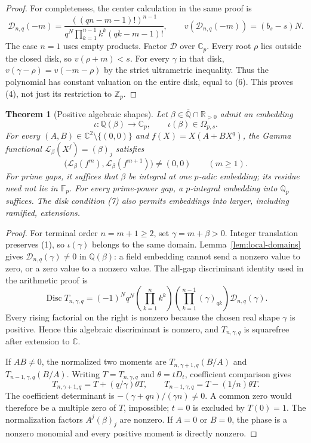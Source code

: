 \documentclass[11pt]{article}
\newtheorem{theorem}[lemma]{Theorem}
\newcommand{\Cp}{\mathbb C_p}
\newcommand{\Zp}{\mathbb Z_p}
\newcommand{\Q}{\mathbb Q}
\newcommand{\C}{\mathbb C}
\begin{document}
\begin{proof}
For completeness, the center calculation in the same proof is
\[
 \mathcal D_{n,q}(-m)=
 \frac{((qn-m-1)!)^{n-1}}
 {q^N\prod_{k=1}^{n-1}k^k(qk-m-1)!},
 \qquad
 v(\mathcal D_{n,q}(-m))=(b_s-s)N.
 \tag{6}
\]
The case $n=1$ uses empty products.
Factor $\mathcal D$ over $\Cp$. Every root $\rho$ lies outside the
closed disk, so $v(\rho+m)<s$.
For every $\gamma$ in that disk,
$v(\gamma-\rho)=v(-m-\rho)$ by the strict ultrametric inequality.
Thus the polynomial has constant valuation on the entire disk,
equal to (6). This proves (4), not just its restriction to $\Zp$.
\end{proof}

\begin{theorem}[Positive algebraic shapes]\label{thm:algebraic-lower-one}
Let $\beta\in\overline{\Q}\cap\mathbb R_{>0}$ admit an embedding
\[
 \iota:\Q(\beta)\longrightarrow\Cp,\qquad
                  \iota(\beta)\in\Omega_{p,s}.
 \tag{7}
\]
For every $(A,B)\in\C^2\setminus\{(0,0)\}$ and
$f(X)=X(A+BX^q)$, the Gamma functional
$\mathcal L_\beta(X^j)=(\beta)_j$ satisfies
\[
 \bigl(\mathcal L_\beta(f^m),\mathcal L_\beta(f^{m+1})\bigr)
                     \ne(0,0)\qquad(m\ge1).
 \tag{8}
\]
For prime gaps, it suffices that $\beta$ be integral at one $p$-adic
embedding; its residue need not lie in $\mathbb F_p$.
For every prime-power gap, a $p$-integral embedding into $\mathbb Q_p$
suffices. The disk condition (7) also permits embeddings into larger,
including ramified, extensions.
\end{theorem}
\begin{proof}
For terminal order $n=m+1\ge2$, set $\gamma=m+\beta>0$.
Integer translation preserves (1), so $\iota(\gamma)$ belongs to the
same domain. Lemma~\ref{lem:local-domains} gives
$\mathcal D_{n,q}(\gamma)\ne0$ in $\Q(\beta)$:
a field embedding cannot send a nonzero value to zero, or a zero value
to a nonzero value.
The all-gap discriminant identity used in the arithmetic proof is
\[
 \operatorname{Disc} T_{n,\gamma,q}
 =(-1)^Nq^N\left(\prod_{k=1}^n k^k\right)
       \left(\prod_{k=1}^{n-1}(\gamma)_{qk}\right)
       \mathcal D_{n,q}(\gamma).
 \tag{9}
\]
Every rising factorial on the right is nonzero because the chosen real
shape $\gamma$ is positive. Hence this algebraic discriminant is nonzero,
and $T_{n,\gamma,q}$ is squarefree after extension to $\C$.

If $AB\ne0$, the normalized two moments are
$T_{n,\gamma+1,q}(B/A)$ and $T_{n-1,\gamma,q}(B/A)$.
Writing $T=T_{n,\gamma,q}$ and $\theta=tD_t$, coefficient comparison gives
\[
 T_{n,\gamma+1,q}=T+(q/\gamma)\theta T,\qquad
 T_{n-1,\gamma,q}=T-(1/n)\theta T.
\]
The coefficient determinant is
$-(\gamma+qn)/(\gamma n)\ne0$.
A common zero would therefore be a multiple zero of $T$, impossible;
$t=0$ is excluded by $T(0)=1$.
The normalization factors $A^j(\beta)_j$ are nonzero.
If $A=0$ or $B=0$, the phase is a nonzero monomial and every positive
moment is directly nonzero.
\end{proof}
\end{document}

